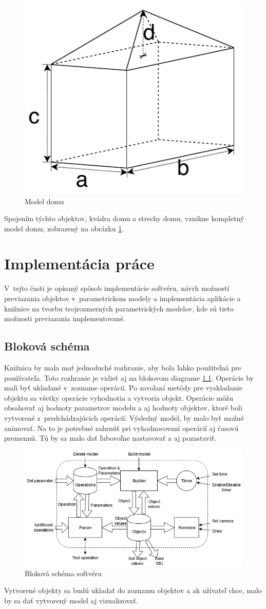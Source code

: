 \begin{figure}[H]
	\centering
	\includegraphics[height=0.3\textwidth]{obrazky-figures/Examples/B4.pdf}
	\caption{Model domu}
	\label{fig:B4}
\end{figure}
Spojením týchto objektov, kvádra domu a strechy domu, vznikne kompletný model domu, zobrazený na obrázku \ref{fig:B4}.


\chapter{Implementácia práce}
V~tejto časti je opísaný spôsob implementácie softvéru, návrh možností previazania objektov v~parametrickom modely a implementácia aplikácie a knižnice na tvorbu trojrozmerných parametrických modelov, kde sú tieto možnosti previazania implementované.  

\section{Bloková schéma}

Knižnica by mala mať jednoduché rozhranie, aby bola ľahko použiteľná pre používateľa. Toto rozhranie je vidieť aj na blokovom diagrame \ref{fig:blockDiagram}. Operácie by mali byť ukladané v~zozname operácií. Po zavolaní metódy pre vyskladanie objektu sa všetky operácie vyhodnotia a vytvoria objekt. Operácie môžu obsahovať aj hodnoty parametrov modelu a aj hodnoty objektov, ktoré boli vytvorené z~predchádzajúcich operácií. Výsledný model, by malo byť možné animovať. Na to je potrebné zahrnúť pri vyhodnocovaní operácií aj časovú premennú. Tú by sa malo dať ľubovoľne nastavovať a aj pozastaviť. 
\begin{figure}[H]
	\centering
	\includegraphics[width=1\textwidth]{obrazky-figures/Diagram.png}
	\caption{Bloková schéma softvéru }
	\label{fig:blockDiagram}
\end{figure}
Vytvorené objekty sa budú ukladať do zoznamu objektov a ak užívateľ chce, malo by sa dať vytvorený model aj vizualizovať. 

